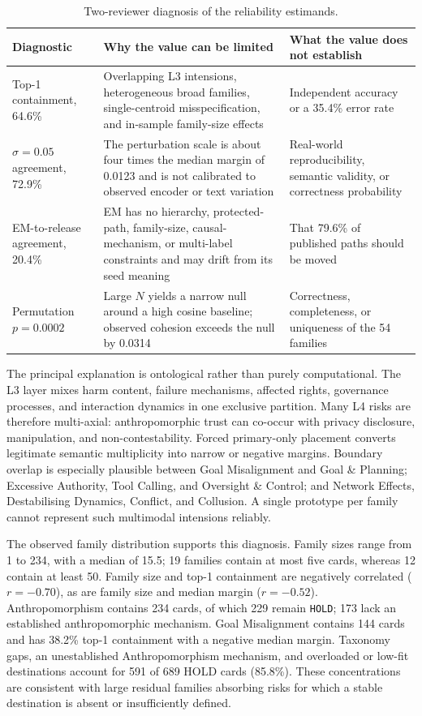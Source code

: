 \documentclass[11pt,a4paper]{article}
\newcommand{\code}[1]{\texttt{#1}}
\begin{document}
\begin{table}[H]
\centering
\caption{Two-reviewer diagnosis of the reliability estimands.}
\small
\begin{tabularx}{\textwidth}{p{2.5cm} X X}
\toprule
Diagnostic & Why the value can be limited & What the value does not establish \\
\midrule
Top-1 containment, 64.6\% & Overlapping L3 intensions, heterogeneous broad
families, single-centroid misspecification, and in-sample family-size effects
& Independent accuracy or a 35.4\% error rate \\
$\sigma=0.05$ agreement, 72.9\% & The perturbation scale is about four times
the median margin of 0.0123 and is not calibrated to observed encoder or text
variation & Real-world reproducibility, semantic validity, or correctness
probability \\
EM-to-release agreement, 20.4\% & EM has no hierarchy, protected-path,
family-size, causal-mechanism, or multi-label constraints and may drift from
its seed meaning & That 79.6\% of published paths should be moved \\
Permutation $p=0.0002$ & Large $N$ yields a narrow null around a high cosine
baseline; observed cohesion exceeds the null by 0.0314 & Correctness,
completeness, or uniqueness of the 54 families \\
\bottomrule
\end{tabularx}
\end{table}

The principal explanation is ontological rather than purely computational.
The L3 layer mixes harm content, failure mechanisms, affected rights,
governance processes, and interaction dynamics in one exclusive partition.
Many L4 risks are therefore multi-axial: anthropomorphic trust can co-occur
with privacy disclosure, manipulation, and non-contestability. Forced
primary-only placement converts legitimate semantic multiplicity into narrow
or negative margins. Boundary overlap is especially plausible between Goal
Misalignment and Goal \& Planning; Excessive Authority, Tool Calling, and
Oversight \& Control; and Network Effects, Destabilising Dynamics, Conflict,
and Collusion. A single prototype per family cannot represent such multimodal
intensions reliably.

The observed family distribution supports this diagnosis. Family sizes range
from 1 to 234, with a median of 15.5; 19 families contain at most five cards,
whereas 12 contain at least 50. Family size and top-1 containment are negatively
correlated ($r=-0.70$), as are family size and median margin ($r=-0.52$).
Anthropomorphism contains 234 cards, of which 229 remain \code{HOLD}; 173 lack
an established anthropomorphic mechanism. Goal Misalignment contains 144
cards and has 38.2\% top-1 containment with a negative median margin. Taxonomy
gaps, an unestablished Anthropomorphism mechanism, and overloaded or low-fit
destinations account for 591 of 689 HOLD cards (85.8\%). These concentrations
are consistent with large residual families absorbing risks for which a
stable destination is absent or insufficiently defined.
\end{document}
